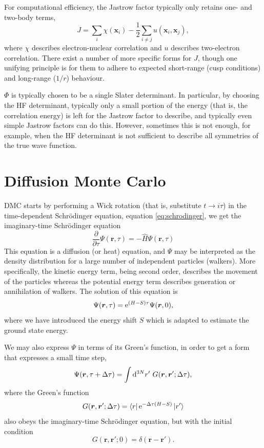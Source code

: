 For computational efficiency, the Jastrow factor typically only retains one- and two-body terms,
\begin{equation}
    J = \sum_i \chi(\bm x_i) - \frac 12 \sum_{i\neq j} u(\bm x_i, \bm x_j),
\end{equation}
where $\chi$ describes electron-nuclear correlation and $u$ describes two-electron correlation. There exist a number of more specific forms for $J$, though one unifying principle is for them to adhere to expected short-range (cusp conditions) and long-range ($1/r$) behaviour.

$\Phi$ is typically chosen to be a single Slater determinant. In particular, by choosing the \gls{HF} determinant, typically only a small portion of the energy (that is, the correlation energy) is left for the Jastrow factor to describe, and typically even simple Jastrow factors can do this. However, sometimes this is not enough, for example, when the HF determinant is not sufficient to describe all symmetries of the true wave function.

\section{Diffusion Monte Carlo}
\Gls{DMC} starts by performing a Wick rotation (that is, substitute $t\to i\tau$) in the time-dependent Schr\"odinger equation, equation \ref{eq:schrodinger}, we get the imaginary-time Schr\"odinger equation
\begin{equation}
    \label{eq:imag_time_schrodinger}
    \frac{\partial}{\partial\tau}\Psi(\bm r, \tau) = -\hat H \Psi(\bm r, \tau)
\end{equation}
This equation is a diffusion (or heat) equation, and $\Psi$ may be interpreted as the density distribution for a large number of independent particles (walkers). More specifically, the kinetic energy term, being second order, describes the movement of the particles whereas the potential energy term describes generation or annihilation of walkers. The solution of this equation is
\begin{equation}
    \Psi(\bm r, \tau) = \mathrm{e}^{(H-S)\tau}\Psi(\bm r, 0),
\end{equation}
where we have introduced the energy shift $S$ which is adapted to estimate the ground state energy.

We may also express $\Psi$ in terms of its Green's function, in order to get a form that expresses a small time step,
\begin{equation}
\Psi(\bm r, \tau+\Delta\tau) = \int\mathrm{d}^{3N}r' \ G(\bm r, \bm r'; \Delta\tau),
\end{equation}
where the Green's function
\begin{equation}
G(\bm r, \bm r'; \Delta\tau) = \bra{r}\mathrm{e}^{-\Delta\tau(H-S)}\ket{r'}
\end{equation}
also obeys the imaginary-time Schr\"odinger equation, but with the initial condition
\begin{equation}
    G(\bm r, \bm r'; 0) = \delta(\bm r-\bm r').
\end{equation}

